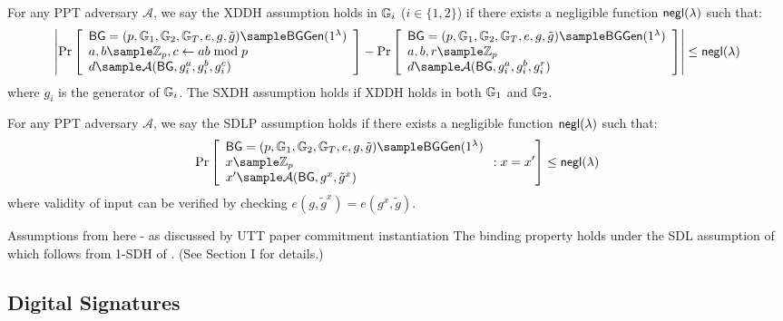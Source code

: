 \begin{definition}
For any PPT adversary $\mathcal{A}$, we say the XDDH assumption holds in $\mathbb{G}_i$ ($i \in \{1,2\}$) if there exists a negligible function ${\mathsf{negl}(\lambda)}$ such that:
$$\left|\Pr\left[\begin{array}{l}
    \BG = (p, \G_1, \G_2, \G_T, e, g, \tilde{g}) \sample \BGGen(1^\lambda) \\
    a, b \sample \Z_p, c \gets ab \bmod p \\
    d \sample \mathcal{A}(\BG, g_i^a, g_i^b, g_i^c)
\end{array}\right] - 
\Pr\left[\begin{array}{l}
    \BG = (p, \G_1, \G_2, \G_T, e, g, \tilde{g}) \sample \BGGen(1^\lambda) \\
    a, b, r \sample \Z_p \\
    d \sample \mathcal{A}(\BG, g_i^a, g_i^b, g_i^r)
\end{array}\right]\right| \leq \negl$$
where $g_i$ is the generator of $\mathbb{G}_i$. The SXDH assumption holds if XDDH holds in both $\mathbb{G}_1$ and $\mathbb{G}_2$.
\end{definition}




\begin{definition}\label{sdlp}
For any PPT adversary $\mathcal{A}$, we say the SDLP assumption holds if there exists a negligible function ${\mathsf{negl}(\lambda)}$ such that:
$$\Pr\left[\begin{array}{l}
    \BG = (p, \G_1, \G_2, \G_T, e, g, \tilde{g}) \sample \BGGen(1^\lambda) \\
    x \sample \Z_p \\
    x' \sample \mathcal{A}(\BG, g^x, \tilde{g}^x)
\end{array} : x = x'\right] \leq \negl$$
where validity of input can be verified by checking $e(g, \tilde{g}^x) = e(g^x, \tilde{g})$.
\end{definition}



Assumptions from here - as discussed by UTT paper commitment instantiation
The binding property holds under the SDL assumption of \cite{hutchison_get_2010}
which follows from 1-SDH of \cite{boneh_short_2008}. (See Section I for details.) 






\subsection{Digital Signatures}

